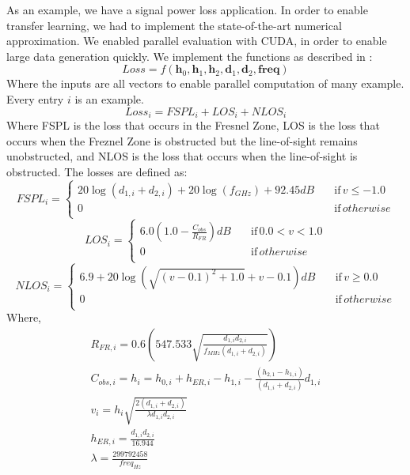 \documentclass[]{article}
\begin{document}
As an example, we have a signal power loss application.  In order to enable transfer learning, we had to implement the state-of-the-art numerical approximation.  We enabled parallel evaluation with CUDA, in order to enable large data generation quickly.  We implement the functions as described in \cite{Nicole_SigProp}:
\begin{equation}
Loss = f(\textbf{h}_0, \textbf{h}_1, \textbf{h}_2, \textbf{d}_1, \textbf{d}_2, \textbf{freq})
\end{equation}
Where the inputs are all vectors to enable parallel computation of many example.  Every entry $i$ is an example.
\begin{equation}
Loss_i = FSPL_i + LOS_i + NLOS_i
\end{equation}
Where FSPL is the loss that occurs in the Fresnel Zone, LOS is the loss that occurs when the Freznel Zone is obstructed but the line-of-sight remains unobstructed, and NLOS is the loss that occurs when the line-of-sight is obstructed.  The losses are defined as:
\begin{equation*}
	FSPL_i =\begin{cases}
		20\log(d_{1,i} + d_{2,i}) + 20\log(f_{GHz}) + 92.45dB \quad &\text{if} \, v\le-1.0 \\
		0 \quad &\text{if} \, otherwise \\
	\end{cases}
\end{equation*}
\begin{equation*}
	LOS_i =\begin{cases}
		6.0(1.0 - \frac{C_{obs}}{R_{FR}})dB \quad &\text{if} \, 0.0 < v < 1.0 \\
		0 \quad &\text{if} \, otherwise \\
	\end{cases}
\end{equation*}
\begin{equation*}
	NLOS_i =\begin{cases}
		6.9 + 20\log(\sqrt{(v-0.1)^2 + 1.0} + v -0.1)dB \quad &\text{if} \, v \ge 0.0 \\
		0 \quad &\text{if} \, otherwise \\
	\end{cases}
\end{equation*}
Where,
\begin{gather}
R_{FR,i} = 0.6(547.533\sqrt{\frac{d_{1,i}d_{2,i}}{f_{MHz}(d_{1,i} + d_{2,i})}})\\
C_{obs,i} = h_i = h_{0,i} + h_{ER,i} - h_{1,i} - \frac{(h_{2,1} - h_{1,i})}{(d_{1,i} + d_{2,i})}d_{1,i}\\
v_i = h_i\sqrt{\frac{2(d_{1,i} + d_{2,i})}{\lambda d_{1,i}d_{2,i}}}\\
h_{ER,i} = \frac{d_{1,i}d_{2,i}}{16.944}\\
\lambda = \frac{299792458}{freq_{Hz}}
\end{gather}
\end{document}
